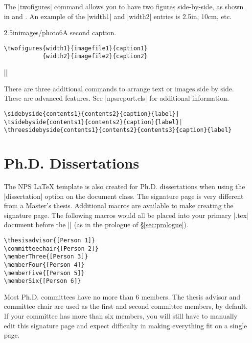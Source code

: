 The |twofigures| command allows you to have two figures side-by-side, 
as shown in  and .
An example of the |width1| and |width2| entries is 2.5in, 10cm, etc.

           {2.5in}{images/photo6}{A second caption.}

\begin{Verbatim}
\twofigures{width1}{imagefile1}{caption1}
           {width2}{imagefile2}{caption2}
\end{Verbatim}

||

There are three additional commands to arrange text or images side by side.  These are 
advanced features.  See |npsreport.cls| for additional information.

\begin{Verbatim}
\sidebyside{contents1}{contents2}{caption}{label}|
\tsidebyside{contents1}{contents2}{caption}{label}|
\threesidebyside{contents1}{contents2}{contents3}{caption}{label}
\end{Verbatim}

\section{Ph.D. Dissertations}\label{sec:dissertation}

The NPS \LaTeX{} template is also created for Ph.D. dissertations when 
using the |dissertation| option on the document class.  
The signature page is very different from a Master's thesis.  
Additional macros are available to make creating the signature page.  
The following macros would all be placed into your primary |.tex| document 
before the || (as in the prologue of \S\ref{sec:prologue}).

\begin{Verbatim}
\thesisadvisor{[Person 1]}
\committeechair{[Person 2]}
\memberThree{[Person 3]}
\memberFour{[Person 4]}
\memberFive{[Person 5]}
\memberSix{[Person 6]}
\end{Verbatim}

Most Ph.D. committees have no more than 6 members. The thesis advisor and 
committee chair are used as the first and second committee members, by default. 
If your committee has more than six members, you will still have to manually 
edit this signature page and expect difficulty in making everything fit on a single page.

